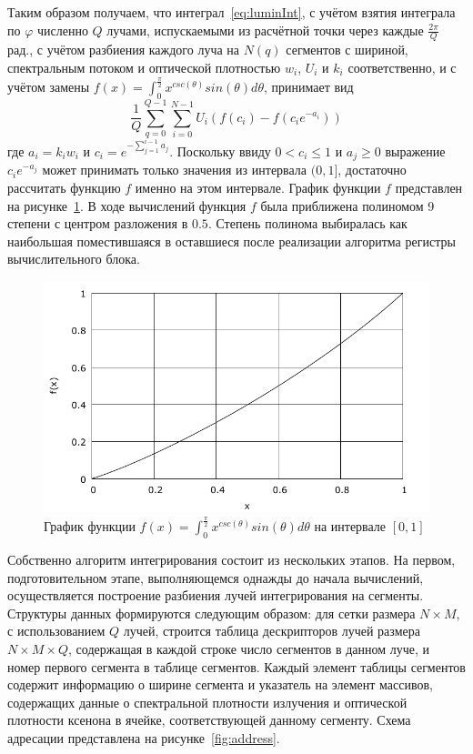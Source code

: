 Таким образом получаем, что интеграл~\eqref{eq:luminInt}, с учётом взятия 
интеграла по $\varphi$ численно $Q$ лучами, испускаемыми из расчётной точки 
через каждые $\frac{2\pi}{Q}$ рад., с учётом разбиения каждого луча на $N(q)$ 
сегментов с шириной, спектральным потоком и оптической плотностью $w_i$, $U_i$ 
и $k_i$ соответственно, и с учётом замены  $f(x) = \int_{0}^{\frac{\pi}{2}} 
x^{csc(\theta)} sin(\theta)d\theta$, принимает вид
\begin{equation}
\frac{1}{Q}
\sum_{q=0}^{Q-1}
\sum_{i=0}^{N-1} U_i 
(f(c_i)-f(c_i e^{-a_i}))
\end{equation}
где $a_i = k_i w_i$ и $c_i = e^{-\sum_{j=1}^{i-1}a_j}$.
Поскольку ввиду $0<c_i\le1$ и $a_j\ge0$ выражение $c_i e^{-a_j}$ может 
принимать только значения из интервала $(0, 1]$, достаточно рассчитать функцию 
$f$ именно на этом интервале. График функции $f$ представлен на 
рисунке~\ref{fig:fplot}. В ходе вычислений функция $f$ была приближена 
полиномом 9 степени с центром разложения в $0.5$. Степень полинома выбиралась 
как наибольшая поместившаяся в оставшиеся после реализации алгоритма регистры 
вычислительного блока.

\begin{figure}
    \centering
    \includegraphics[width=.5\linewidth]{img/luminInt/fdata}
    \caption{График функции $f(x) = \int_{0}^{\frac{\pi}{2}} x^{csc(\theta)} 
    sin(\theta)d\theta$ на интервале $[0, 1]$}
    \label{fig:fplot}
\end{figure}

Собственно алгоритм интегрирования состоит из нескольких этапов. На первом, 
подготовительном этапе, выполняющемся однажды до начала вычислений, 
осуществляется построение разбиения лучей интегрирования на сегменты. Структуры 
данных формируются следующим образом: для сетки размера $N \times M$, с 
использованием $Q$ лучей, строится таблица дескрипторов лучей размера $N\times 
M \times Q$, содержащая в каждой строке число сегментов в данном луче, и номер 
первого сегмента в таблице сегментов. Каждый элемент таблицы сегментов содержит 
информацию о ширине сегмента и указатель на элемент массивов, содержащих данные 
о спектральной плотности излучения и оптической плотности ксенона в ячейке, 
соответствующей данному сегменту.
Схема адресации представлена на рисунке~\ref{fig:address}. 

